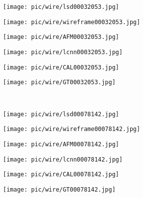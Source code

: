 \documentclass[runningheads]{llncs}
\begin{document}
\begin{figure}[H]
     \begin{center}
     \begin{subfigure}[b]{0.15\textwidth}
         \centering
         \texttt{[image: pic/wire/lsd00032053.jpg]}
     \end{subfigure}
    \begin{subfigure}[b]{0.15\textwidth}
         \centering
         \texttt{[image: pic/wire/wireframe00032053.jpg]}
     \end{subfigure}
     \begin{subfigure}[b]{0.15\textwidth}
         \centering
         \texttt{[image: pic/wire/AFM00032053.jpg]}
     \end{subfigure}
     \begin{subfigure}[b]{0.15\textwidth}
         \centering
         \texttt{[image: pic/wire/lcnn00032053.jpg]}
     \end{subfigure}
     \begin{subfigure}[b]{0.15\textwidth}
         \centering
         \texttt{[image: pic/wire/CAL00032053.jpg]}
     \end{subfigure}
     \begin{subfigure}[b]{0.15\textwidth}
         \centering
         \texttt{[image: pic/wire/GT00032053.jpg]}
     \end{subfigure}
     ~~
     
      \begin{subfigure}[b]{0.15\textwidth}
         \centering
         \texttt{[image: pic/wire/lsd00078142.jpg]}
     \end{subfigure}
    \begin{subfigure}[b]{0.15\textwidth}
         \centering
         \texttt{[image: pic/wire/wireframe00078142.jpg]}
     \end{subfigure}
     \begin{subfigure}[b]{0.15\textwidth}
         \centering
         \texttt{[image: pic/wire/AFM00078142.jpg]}
     \end{subfigure}
     \begin{subfigure}[b]{0.15\textwidth}
         \centering
         \texttt{[image: pic/wire/lcnn00078142.jpg]}
     \end{subfigure}
     \begin{subfigure}[b]{0.15\textwidth}
         \centering
         \texttt{[image: pic/wire/CAL00078142.jpg]}
     \end{subfigure}
     \begin{subfigure}[b]{0.15\textwidth}
         \centering
         \texttt{[image: pic/wire/GT00078142.jpg]}
     \end{subfigure}
     ~~
     

\end{center}
\end{figure}
\end{document}
